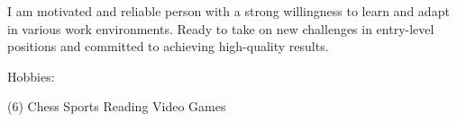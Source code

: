 I am motivated and reliable person with a strong willingness to learn and adapt in various work environments.
Ready to take on new challenges in entry-level positions and committed to achieving high-quality results.
\begin{cvparagraph}



Hobbies:
\begin{tasks}[style=itemize, column-sep=-35mm, label-align=center, label-offset={0mm}, label-width={3mm}, item-indent={40mm}](6)%
\task Chess
\task Sports
\task Reading 
\task Video Games

\end{tasks}
\end{cvparagraph}
